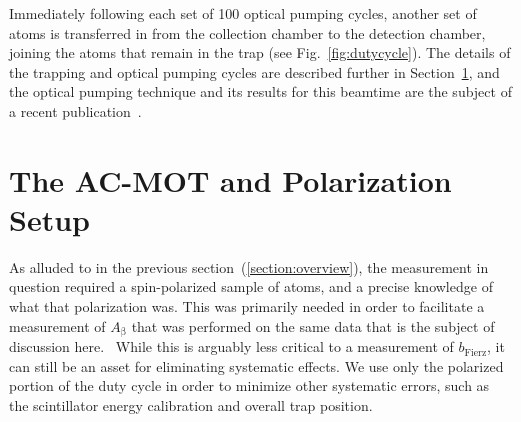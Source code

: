 Immediately following each set of 100 optical pumping cycles, another set of atoms is transferred in from the collection chamber to the detection chamber, joining the atoms that remain in the trap (see Fig.~\ref{fig:dutycycle}).  The details of the trapping and optical pumping cycles are described further in Section~\ref{section:acmot_and_polarization}, and the optical pumping technique and its results for this beamtime are the subject of a recent publication~\cite{ben_OP}.



\section{The AC-MOT and Polarization Setup}
\label{section:acmot_and_polarization}



As alluded to in the previous section~(\ref{section:overview}), the measurement in question required a spin-polarized sample of atoms, and a precise knowledge of what that polarization was.  This was primarily needed in order to facilitate a measurement of $A_{\mathrm{\beta}}$ that was performed on the same data that is the subject of discussion here.~\cite{ben_Abeta}   
While this is arguably less critical to a measurement of $b_{\mathrm{Fierz}}$, it can still be an asset for eliminating systematic effects.  We use only the polarized portion of the duty cycle in order to minimize other systematic errors, such as the scintillator energy calibration and overall trap position.  


